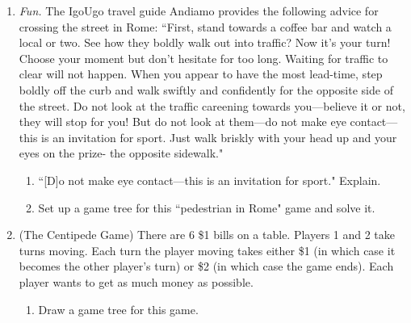\begin{enumerate}
\item{} \emph{Fun.} The IgoUgo travel guide Andiamo provides the following advice for crossing the street in Rome: ``First, stand towards a coffee bar and watch a local or two. See how they boldly walk out into traffic? Now it's your turn! Choose your moment but don't hesitate for too long. Waiting for traffic to clear will not happen. When you appear to have the most lead-time, step boldly off the curb and walk swiftly and confidently for the opposite side of the street. Do not look at the traffic careening towards you---believe it or not, they will stop for you! But do not look at them---do not make eye contact---this is an invitation for sport. Just walk briskly with your head up and your eyes on the prize- the opposite sidewalk."

    \begin{enumerate}

    \item ``[D]o not make eye contact---this is an invitation for sport." Explain.


    \item Set up a game tree for this ``pedestrian in Rome" game and solve it.

    \end{enumerate}









\item (The Centipede Game) There are 6 \$1 bills on a table. Players 1 and 2 take turns moving. Each turn the player moving takes either \$1 (in which case it becomes the other player's turn) or \$2 (in which case the game ends). Each player wants to get as much money as possible.

    \begin{enumerate}

    \item Draw a game tree for this game.



\end{enumerate}
\end{enumerate}
